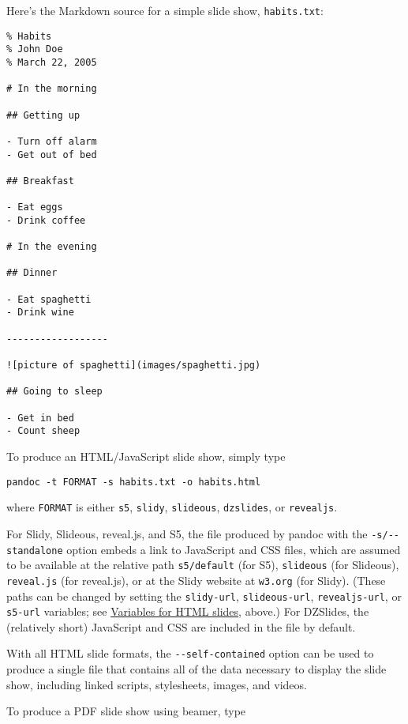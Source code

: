 \documentclass[]{article}
\begin{document}
Here's the Markdown source for a simple slide show, \texttt{habits.txt}:

\begin{verbatim}
% Habits
% John Doe
% March 22, 2005

# In the morning

## Getting up

- Turn off alarm
- Get out of bed

## Breakfast

- Eat eggs
- Drink coffee

# In the evening

## Dinner

- Eat spaghetti
- Drink wine

------------------

![picture of spaghetti](images/spaghetti.jpg)

## Going to sleep

- Get in bed
- Count sheep
\end{verbatim}

To produce an HTML/JavaScript slide show, simply type

\begin{verbatim}
pandoc -t FORMAT -s habits.txt -o habits.html
\end{verbatim}

where \texttt{FORMAT} is either \texttt{s5}, \texttt{slidy},
\texttt{slideous}, \texttt{dzslides}, or \texttt{revealjs}.

For Slidy, Slideous, reveal.js, and S5, the file produced by pandoc with
the \texttt{-s/-\/-standalone} option embeds a link to JavaScript and
CSS files, which are assumed to be available at the relative path
\texttt{s5/default} (for S5), \texttt{slideous} (for Slideous),
\texttt{reveal.js} (for reveal.js), or at the Slidy website at
\texttt{w3.org} (for Slidy). (These paths can be changed by setting the
\texttt{slidy-url}, \texttt{slideous-url}, \texttt{revealjs-url}, or
\texttt{s5-url} variables; see
\protect\hyperlink{variables-for-html-slides}{Variables for HTML
slides}, above.) For DZSlides, the (relatively short) JavaScript and CSS
are included in the file by default.

With all HTML slide formats, the \texttt{-\/-self-contained} option can
be used to produce a single file that contains all of the data necessary
to display the slide show, including linked scripts, stylesheets,
images, and videos.

To produce a PDF slide show using beamer, type
\end{document}
